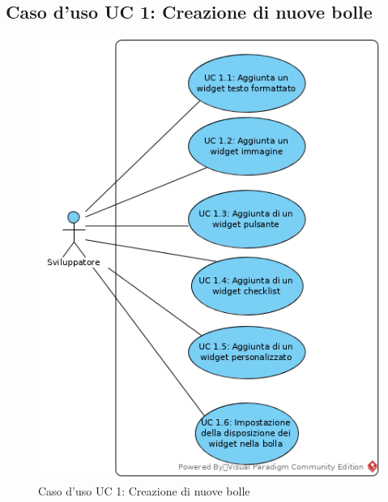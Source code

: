 \newpage
\subsection{Caso d'uso UC 1: Creazione di nuove bolle}
\label{Caso d'uso UC 1: Creazione di nuove bolle}
\begin{figure}[ht]
	\centering
	\includegraphics[scale=0.65]{Usecases/img/UC1.png}
	\caption{Caso d'uso UC 1: Creazione di nuove bolle}
\end{figure}

